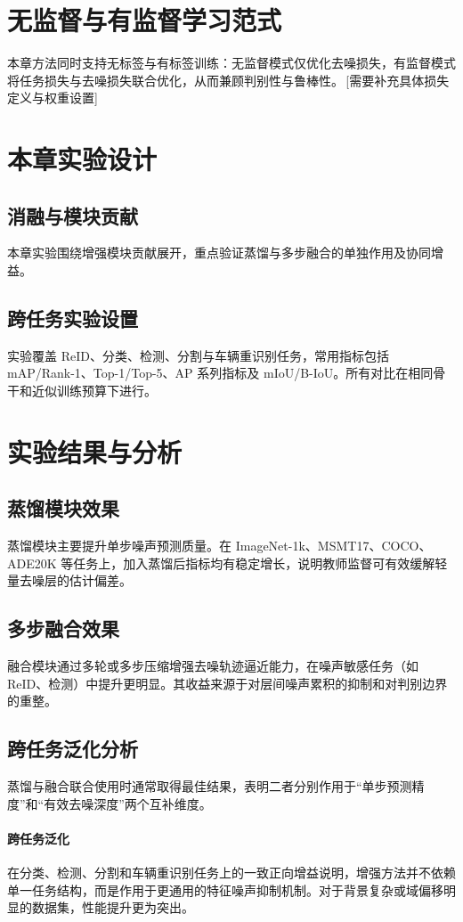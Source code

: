 \section{无监督与有监督学习范式}
本章方法同时支持无标签与有标签训练：无监督模式仅优化去噪损失，有监督模式将任务损失与去噪损失联合优化，从而兼顾判别性与鲁棒性。\,[需要补充具体损失定义与权重设置]

\section{本章实验设计}
\subsection{消融与模块贡献}
本章实验围绕增强模块贡献展开，重点验证蒸馏与多步融合的单独作用及协同增益。

\subsection{跨任务实验设置}
实验覆盖 ReID、分类、检测、分割与车辆重识别任务，常用指标包括 mAP/Rank-1、Top-1/Top-5、AP 系列指标及 mIoU/B-IoU。所有对比在相同骨干和近似训练预算下进行。

\section{实验结果与分析}
\subsection{蒸馏模块效果}
蒸馏模块主要提升单步噪声预测质量。在 ImageNet-1k、MSMT17、COCO、ADE20K 等任务上，加入蒸馏后指标均有稳定增长，说明教师监督可有效缓解轻量去噪层的估计偏差。

\subsection{多步融合效果}
融合模块通过多轮或多步压缩增强去噪轨迹逼近能力，在噪声敏感任务（如 ReID、检测）中提升更明显。其收益来源于对层间噪声累积的抑制和对判别边界的重整。

\subsection{跨任务泛化分析}
蒸馏与融合联合使用时通常取得最佳结果，表明二者分别作用于“单步预测精度”和“有效去噪深度”两个互补维度。
\paragraph{跨任务泛化} 在分类、检测、分割和车辆重识别任务上的一致正向增益说明，增强方法并不依赖单一任务结构，而是作用于更通用的特征噪声抑制机制。对于背景复杂或域偏移明显的数据集，性能提升更为突出。
